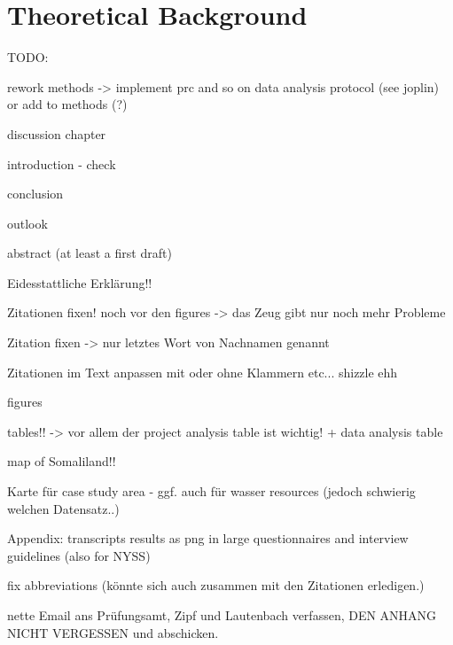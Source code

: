 
\chapter{Theoretical Background} %

\label{ChapterX} %


TODO:

rework methods -> implement prc and so on
data analysis protocol (see joplin) or add to methods (?)

discussion chapter

introduction - check

conclusion

outlook

abstract (at least a first draft)

Eidesstattliche Erklärung!!


Zitationen fixen! noch vor den figures -> das Zeug gibt nur noch mehr Probleme

Zitation fixen -> nur letztes Wort von Nachnamen genannt

Zitationen im Text anpassen mit oder ohne Klammern etc... shizzle ehh

figures

tables!! -> vor allem der project analysis table ist wichtig! + data analysis table

map of Somaliland!!

Karte für case study area - ggf. auch für wasser resources (jedoch schwierig welchen Datensatz..)



Appendix:
transcripts
results as png in large
questionnaires and interview guidelines (also for NYSS)

fix abbreviations (könnte sich auch zusammen mit den Zitationen erledigen.)

nette Email ans Prüfungsamt, Zipf und Lautenbach verfassen, DEN ANHANG NICHT VERGESSEN und abschicken.

